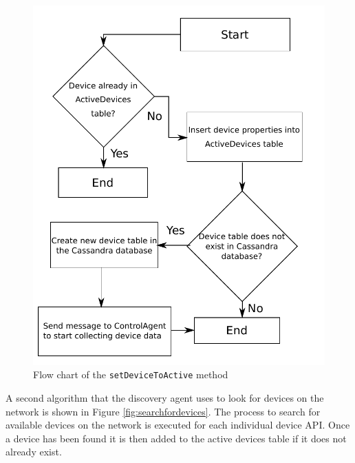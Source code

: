 \documentclass[letterpaper,12pt]{article}   %
\begin{document}
\begin{figure}[H]
    \centering
    \includegraphics[scale=0.95]{figs/setDeviceToActiveFlow.pdf}
    \caption{Flow chart of the \texttt{setDeviceToActive} method}
    \label{fig:setdevicetoactive}
\end{figure}

A second algorithm that the discovery agent uses to look for devices on the network is shown in Figure \ref{fig:searchfordevices}. The process to search for available devices on the network is executed for each individual device API. Once a device has been found it is then added to the active devices table if it does not already exist.
\end{document}
